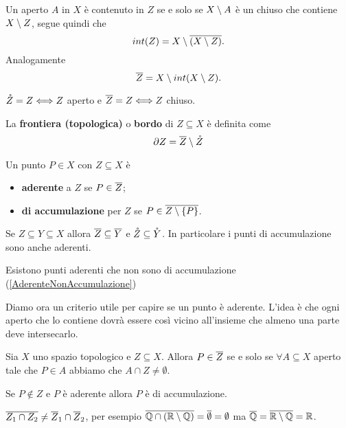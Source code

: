 \begin{multicols*}{2}
\begin{remark}
Un aperto $A$ in $X$ è contenuto in $Z$ se e solo se $X\setminus A$ è un chiuso che contiene $X\setminus Z$, segue quindi che
\[int(Z)=X\setminus\overline{(X\setminus Z)}.\]
Analogamente
\[\overline{Z}=X\setminus int(X\setminus Z).\]
\end{remark}
\begin{remark}
${\mathring {Z}}=Z\Longleftrightarrow Z$ aperto e $\overline{Z}=Z\Longleftrightarrow Z$ chiuso.
\end{remark}
\begin{definition}[Frontiera]
La \textbf{frontiera (topologica)} o \textbf{bordo} di $Z\subseteq X$ è definita come
\[\partial Z=\overline{Z}\setminus {\mathring {Z}}\]
\end{definition}
\begin{definition}
Un punto $P\in X$ con $Z\subseteq X$ è
\begin{itemize}[noitemsep]
\item \textbf{aderente} a $Z$ se $P\in \overline{Z}$;
\item \textbf{di accumulazione} per $Z$ se $P\in \overline{Z\setminus \{P\}}$.
\end{itemize}
\end{definition}
\begin{remark}
Se $Z\subseteq Y\subseteq X$ allora $\overline{Z}\subseteq \overline{Y}$ e ${\mathring {Z}}\subseteq {\mathring {Y}}$. In particolare i punti di accumulazione sono anche aderenti.
\end{remark}
\begin{remark}
Esistono punti aderenti che non sono di accumulazione (\ref{AderenteNonAccumulazione})
\end{remark}
\noindent
Diamo ora un criterio utile per capire se un punto è aderente. L'idea è che ogni aperto che lo contiene dovrà essere così vicino all'insieme che almeno una parte deve intersecarlo.
\begin{proposition}\label{CaratterizzazioneChiusura}
Sia $X$ uno spazio topologico e $Z\subseteq X$. Allora $P\in \overline{Z}$ se e solo se $\forall A\subseteq X$ aperto tale che $P\in A$ abbiamo che $A\cap Z\neq \emptyset$.
\end{proposition}

\begin{proposition}
Se $P\notin Z$ e $P$ è aderente allora $P$ è di accumulazione.
\end{proposition}

\begin{remark}
$\overline{Z_1\cap Z_2}\neq \overline{Z}_1\cap \overline{Z}_2$, per esempio $\overline{\mathbb{Q}\cap (\mathbb{R}\setminus \mathbb{Q})}=\overline{\emptyset}=\emptyset$ ma $\overline{\mathbb{Q}}=\overline{\mathbb{R}\setminus \mathbb{Q}}=\mathbb{R}$.
\end{remark}


\end{multicols*}
